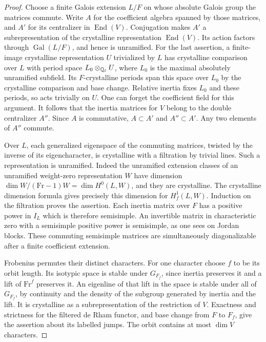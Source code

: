 \documentclass[a4paper,11pt]{article}
\theoremstyle{definition}
\theoremstyle{remark}
\numberwithin{equation}{section}
\begin{document}
\begin{proof}
Choose a finite Galois extension \(L/F\) on whose absolute
Galois group the matrices commute. Write \(A\) for the
coefficient algebra spanned by those matrices, and \(A'\)
for its centralizer in \(\operatorname{End}(V)\).
Conjugation makes \(A'\) a subrepresentation of the crystalline
representation \(\operatorname{End}(V)\). Its action factors through
\(\operatorname{Gal}(L/F)\), and hence is unramified. For the last
assertion, a finite-image crystalline representation \(U\) trivialized
by \(L\) has crystalline comparison over \(L\) with period space
\(L_0\otimes_{\mathbb Q_\ell} U\), where \(L_0\) is the maximal absolutely
unramified subfield. Its \(F\)-crystalline periods span this space
over \(L_0\) by the crystalline comparison and base change. Relative
inertia fixes \(L_0\) and these periods, so acts trivially on \(U\).
One can forget the coefficient field for this argument.
It follows that the inertia matrices for \(V\) belong to the
double centralizer \(A''\). Since \(A\) is commutative,
\(A\subset A'\) and \(A''\subset A'\). Any two elements of
\(A''\) commute.

Over \(L\), each generalized eigenspace of the commuting matrices,
twisted by the inverse of its eigencharacter, is crystalline with
a filtration by trivial lines. Such a representation is unramified.
Indeed the unramified extension classes of an unramified weight-zero
representation \(W\) have dimension
\(\dim W/(\mathrm{Fr}-1)W=\dim H^0(L,W)\), and they are
crystalline. The crystalline dimension formula gives precisely
this dimension for \(H^1_f(L,W)\). Induction on the filtration
proves the assertion. Each inertia matrix over \(F\) has a positive
power in \(I_L\) which is therefore semisimple. An invertible
matrix in characteristic zero with a semisimple positive power
is semisimple, as one sees on Jordan blocks. These commuting
semisimple matrices are simultaneously diagonalizable after a
finite coefficient extension.

Frobenius permutes their distinct characters. For one character
choose \(f\) to be its orbit length. Its isotypic space is stable
under \(G_{F_f}\), since inertia preserves it and a lift of
\(\mathrm{Fr}^f\) preserves it. An eigenline of that lift in
the space is stable under all of \(G_{F_f}\), by continuity and
the density of the subgroup generated by inertia and the lift.
It is crystalline as a subrepresentation of the restriction of
\(V\). Exactness and strictness for the filtered de Rham functor,
and base change from \(F\) to \(F_f\), give the assertion about
its labelled jumps. The orbit contains at most \(\dim V\)
characters.
\end{proof}
\end{document}
